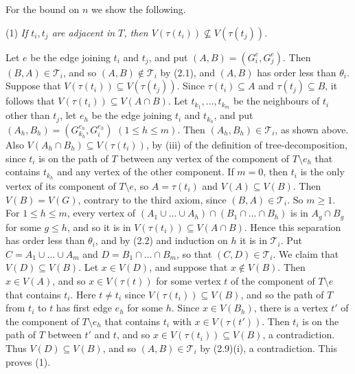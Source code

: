 {For the bound on $n$ we show the following.

\hspace*{12pt}(1) \textit{If $t_i, t_j$ are adjacent in $T$, then $V(\tau(t_i)) \not\subseteq V(\tau(t_j))$.}

Let $e$ be the edge joining $t_i$ and $t_j$, and put $(A, B) = (G^e_i, G^e_j)$. Then $(B, A) \in \mathscr{T}_i$, and so $(A, B) \notin \mathscr{T}_i$ by (2.1), and $(A, B)$ has order less than $\theta_i$. Suppose that $V(\tau(t_i)) \subseteq V(\tau(t_j))$. Since $\tau(t_i) \subseteq A$ and $\tau(t_j) \subseteq B$, it follows that $V(\tau(t_i)) \subseteq V(A \cap B)$. Let $t_{k_1}, \dots, t_{k_m}$ be the neighbours of $t_i$ other than $t_j$, let $e_h$ be the edge joining $t_i$ and $t_{k_h}$, and put $(A_h, B_h) = (G^{e_h}_{k_h}, G^{e_h}_i)$ $(1 \le h \le m)$. Then $(A_h, B_h) \in \mathscr{T}_i$, as shown above. Also $V(A_h \cap B_h) \subseteq V(\tau(t_i))$, by (iii) of the definition of tree-decomposition, since $t_i$ is on the path of $T$ between any vertex of the component of $T \setminus e_h$ that contains $t_{k_h}$ and any vertex of the other component. If $m = 0$, then $t_i$ is the only vertex of its component of $T \setminus e$, so $A = \tau(t_i)$ and $V(A) \subseteq V(B)$. Then $V(B) = V(G)$, contrary to the third axiom, since $(B, A) \in \mathscr{T}_i$. So $m \ge 1$. For $1 \le h \le m$, every vertex of $(A_1 \cup \dots \cup A_h) \cap (B_1 \cap \dots \cap B_h)$ is in $A_g \cap B_g$ for some $g \le h$, and so it is in $V(\tau(t_i)) \subseteq V(A \cap B)$. Hence this separation has order less than $\theta_i$, and by (2.2) and induction on $h$ it is in $\mathscr{T}_i$. Put $C = A_1 \cup \dots \cup A_m$ and $D = B_1 \cap \dots \cap B_m$, so that $(C, D) \in \mathscr{T}_i$. We claim that $V(D) \subseteq V(B)$. Let $x \in V(D)$, and suppose that $x \notin V(B)$. Then $x \in V(A)$, and so $x \in V(\tau(t))$ for some vertex $t$ of the component of $T \setminus e$ that contains $t_i$. Here $t \ne t_i$ since $V(\tau(t_i)) \subseteq V(B)$, and so the path of $T$ from $t_i$ to $t$ has first edge $e_h$ for some $h$. Since $x \in V(B_h)$, there is a vertex $t'$ of the component of $T \setminus e_h$ that contains $t_i$ with $x \in V(\tau(t'))$. Then $t_i$ is on the path of $T$ between $t'$ and $t$, and so $x \in V(\tau(t_i)) \subseteq V(B)$, a contradiction. Thus $V(D) \subseteq V(B)$, and so $(A, B) \in \mathscr{T}_i$ by (2.9)(i), a contradiction. This proves (1).

}
